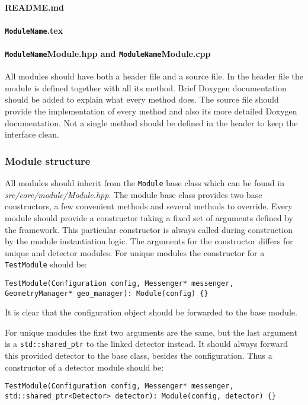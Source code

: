 \paragraph{README.md}
\wip

\paragraph{\texttt{ModuleName}.tex}
\wip

\paragraph{\texttt{ModuleName}Module.hpp and \texttt{ModuleName}Module.cpp}
All modules should have both a header file and a source file. In the header file the module is defined together with all its method. Brief Doxygen documentation should be added to explain what every method does. The source file should provide the implementation of every method and also its more detailed Doxygen documentation. Not a single method should be defined in the header to keep the interface clean.

\subsubsection{Module structure}
\label{sec:module_structure}
All modules should inherit from the \texttt{Module} base class which can be found in \textit{src/core/module/Module.hpp}. The module base class provides two base constructors, a few convenient methods and several methods to override. Every module should provide a constructor taking a fixed set of arguments defined by the framework. This particular constructor is always called during construction by the module instantiation logic. The arguments for the constructor differs for unique and detector modules. For unique modules the constructor for a \texttt{TestModule} should be:
\begin{verbatim}
TestModule(Configuration config, Messenger* messenger, GeometryManager* geo_manager): Module(config) {}
\end{verbatim}
It is clear that the configuration object should be forwarded to the base module.

For unique modules the first two arguments are the same, but the last argument is a \texttt{std::shared\_ptr} to the linked detector instead. It should always forward this provided detector to the base class, besides the configuration. Thus a constructor of a detector module should be:
\begin{verbatim}
TestModule(Configuration config, Messenger* messenger, std::shared_ptr<Detector> detector): Module(config, detector) {}
\end{verbatim}

